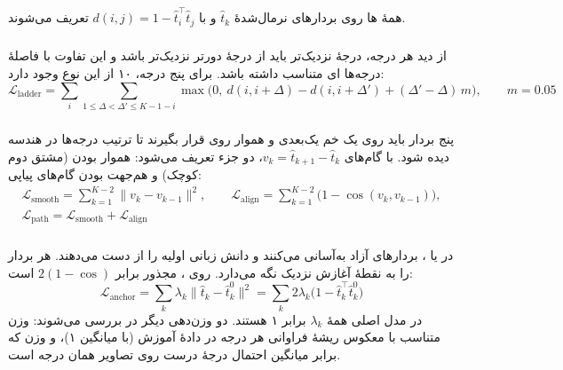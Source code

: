 \subsection{}
همهٔ ها روی بردارهای نرمال‌شدهٔ $\hat{t}_k$ و با  $d(i, j) = 1 - \hat{t}_i^{\top} \hat{t}_j$ تعریف می‌شوند.

\subsubsection{}
از دید هر درجه، درجهٔ نزدیک‌تر باید از درجهٔ دورتر نزدیک‌تر باشد و این تفاوت با فاصلهٔ درجه‌ها ‌ای متناسب داشته باشد. برای پنج درجه، ۱۰  از این نوع وجود دارد:
\begin{equation}
\mathcal{L}_{\mathrm{ladder}} = \sum_{i} \sum_{1 \le \Delta < \Delta' \le K-1-i} \max\!\Big(0,\ d(i, i{+}\Delta) - d(i, i{+}\Delta') + (\Delta' - \Delta)\, m\Big), \qquad m = 0.05
\label{eq:ladder}
\end{equation}

\subsubsection{}
پنج بردار باید روی یک خم یک‌بعدی و هموار روی  قرار بگیرند تا ترتیب درجه‌ها در هندسه دیده شود. با گام‌های $v_k = \hat{t}_{k+1} - \hat{t}_k$، دو جزء تعریف می‌شود: هموار بودن (مشتق دوم کوچک) و هم‌جهت بودن گام‌های پیاپی:
\begin{equation}
\begin{gathered}
\mathcal{L}_{\mathrm{smooth}} = \sum_{k=1}^{K-2} \lVert v_k - v_{k-1} \rVert^2, \qquad \mathcal{L}_{\mathrm{align}} = \sum_{k=1}^{K-2} \big(1 - \cos(v_k, v_{k-1})\big),\\
\mathcal{L}_{\mathrm{path}} = \mathcal{L}_{\mathrm{smooth}} + \mathcal{L}_{\mathrm{align}}
\end{gathered}
\label{eq:path}
\end{equation}

\subsubsection{}
در   یا ، بردارهای آزاد به‌آسانی  می‌کنند و دانش زبانی اولیه را از دست می‌دهند.  هر بردار را به نقطهٔ آغازش نزدیک نگه می‌دارد. روی ، مجذور  برابر $2(1 - \cos)$ است:
\begin{equation}
\mathcal{L}_{\mathrm{anchor}} = \sum_k \lambda_k \lVert \hat{t}_k - \hat{t}^{0}_k \rVert^2 = \sum_k 2 \lambda_k \big(1 - \hat{t}_k^{\top} \hat{t}^{0}_k\big)
\label{eq:anchor}
\end{equation}
در مدل اصلی همهٔ $\lambda_k$ برابر ۱ هستند. دو وزن‌دهی دیگر در  بررسی می‌شوند: وزن متناسب با معکوس ریشهٔ فراوانی هر درجه در دادهٔ آموزش (با میانگین ۱)، و وزن  که برابر میانگین احتمال  درجهٔ درست روی تصاویر  همان درجه است.

